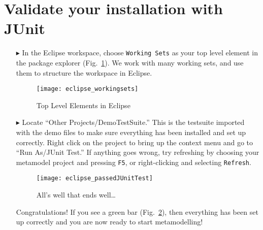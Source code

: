 \newpage
\genHeader
{}

\section{Validate your installation with JUnit}

\begin{itemize}

\item[$\blacktriangleright$] In\hypertarget{validate common}{} the Eclipse workspace, choose \texttt{Working Sets} as your top level element in the package explorer
(Fig.~\ref{fig_topLevel}). We work with many working sets, and use them to structure the workspace in Eclipse.

\begin{figure}[htbp]
	\centering
  \texttt{[image: eclipse\_workingsets]}
	\caption{Top Level Elements in Eclipse}
	\label{fig_topLevel}
\end{figure}

\item[$\blacktriangleright$] Locate ``Other Projects/DemoTestSuite.'' This is the testsuite imported with the demo files to make sure everything has been installed and
set up correctly. Right click on the project to bring up the context menu and go to ``Run As/JUnit Test.'' If anything goes wrong, try refreshing by choosing
your metamodel project and pressing  \texttt{F5}, or right-clicking and selecting \texttt{Refresh}.

\vspace{0.5cm}

\begin{figure}[htbp]
	\centering
  \texttt{[image: eclipse\_passedJUnitTest]}
	\caption{All's well that ends well\ldots}
	\label{fig_passedTest}
\end{figure}

\vspace{0.5cm}

Congratulations!  If you see a green bar  (Fig.~\ref{fig_passedTest}), then everything has been set up correctly and you are now ready to start metamodelling!

\end{itemize}